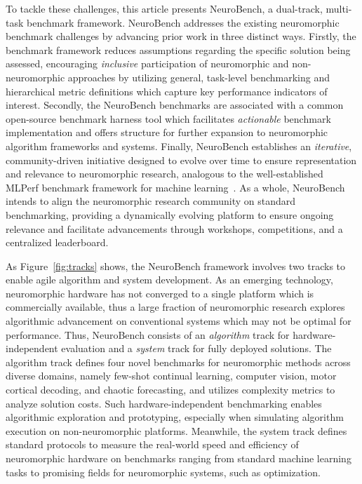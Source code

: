 To tackle these challenges, this article presents NeuroBench, a dual-track, multi-task benchmark framework. 
NeuroBench addresses the existing neuromorphic benchmark challenges by advancing prior work in three distinct ways. Firstly, the benchmark framework reduces assumptions regarding the specific solution being assessed, encouraging \textit{inclusive} participation of neuromorphic and non-neuromorphic approaches by utilizing general, task-level benchmarking and hierarchical metric definitions which capture key performance indicators of interest. Secondly, the NeuroBench benchmarks are associated with a common open-source benchmark harness tool which facilitates \textit{actionable} benchmark implementation and offers structure for further expansion to neuromorphic algorithm frameworks and systems. Finally, NeuroBench establishes an \textit{iterative}, community-driven initiative designed to evolve over time to ensure representation and relevance to neuromorphic research, analogous to the well-established MLPerf benchmark framework for machine learning~\cite{Reddi2020, mattson2020mlperf}.
As a whole, NeuroBench intends to align the neuromorphic research community on standard benchmarking, providing a dynamically evolving platform to ensure ongoing relevance and facilitate advancements through workshops, competitions, and a centralized leaderboard.

As Figure~\ref{fig:tracks} shows, the NeuroBench framework involves two tracks to enable agile algorithm and system development. As an emerging technology, neuromorphic hardware has not converged to a single platform which is commercially available, thus a large fraction of neuromorphic research explores algorithmic advancement on conventional systems which may not be optimal for performance. Thus, NeuroBench consists of an \textit{algorithm} track for hardware-independent evaluation and a \textit{system} track for fully deployed solutions. The algorithm track defines four novel benchmarks for neuromorphic methods across diverse domains, namely few-shot continual learning, computer vision, motor cortical decoding, and chaotic forecasting, and utilizes complexity metrics to analyze solution costs. Such hardware-independent benchmarking enables algorithmic exploration and prototyping, especially when simulating algorithm execution on non-neuromorphic platforms. Meanwhile, the system track defines standard protocols to measure the real-world speed and efficiency of neuromorphic hardware on benchmarks ranging from standard machine learning tasks to promising fields for neuromorphic systems, such as optimization. 

